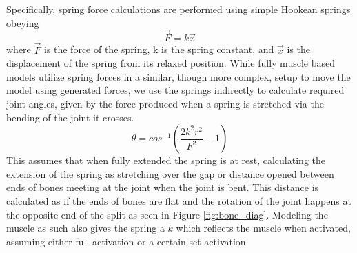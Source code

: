 \documentclass[landscape,26pt]{sciposter}
\begin{document}
\begin{minipage}[t]{17in}
        Specifically, spring force calculations are performed using simple Hookean springs obeying \[ \vec{F} = k\vec{x} \] where $\vec{F}$ is the force of the spring, k is the spring constant, and $\vec{x}$ is the displacement of the spring from its relaxed position.  While fully muscle based models utilize spring forces in a similar, though more complex, setup to move the model using generated forces, we use the springs indirectly to calculate required joint angles, given by the force produced when a spring is stretched via the bending of the joint it crosses. \[\theta = cos^{-1} \left( \dfrac{2 k^2 r^2}{F^2} - 1 \right)\] This assumes that when fully extended the spring is at rest, calculating the extension of the spring as stretching over the gap or distance opened between ends of bones meeting at the joint when the joint is bent.  This distance is calculated as if the ends of bones are flat and the rotation of the joint happens at the opposite end of the split as seen in Figure \ref{fig:bone_diag}.  Modeling the muscle as such also gives the spring a $k$ which reflects the muscle when activated, assuming either full activation or a certain set activation.

\end{minipage}
%
\hfill
\end{document}
